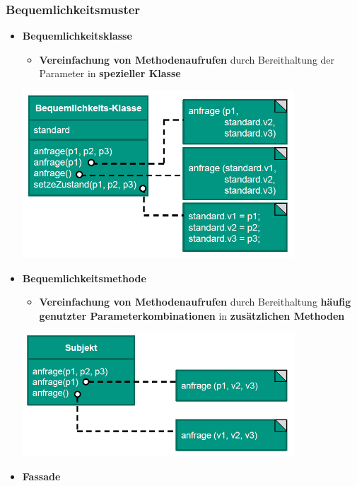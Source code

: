 \subsubsection{Bequemlichkeitsmuster}
		
\begin{itemize}
\item \textbf{Bequemlichkeitsklasse}
\begin{itemize}
\item \textbf{Vereinfachung von Methodenaufrufen} durch Bereithaltung der Parameter in \textbf{spezieller Klasse}
\end{itemize}
\begin{center}
\includegraphics[width=0.8\textwidth]{../images/bequemlichkeitsklasse.png}
\end{center}
\item \textbf{Bequemlichkeitsmethode}
\begin{itemize}
\item \textbf{Vereinfachung von Methodenaufrufen} durch Bereithaltung \textbf{häufig genutzter Parameterkombinationen} in \textbf{zusätzlichen Methoden}
\end{itemize}
\begin{center}
\includegraphics[width=0.8\textwidth]{../images/bequemlichkeitsmethode.png}
\end{center}
\newpage
\item \textbf{Fassade}
\begin{itemize}

\end{itemize}
\end{itemize}
